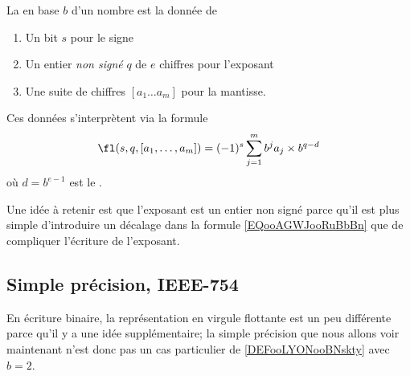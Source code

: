 \begin{definition}     \label{DEFooLYONooBNskty}
    La  en base \( b\) d'un nombre est la donnée de 
    \begin{enumerate}
        \item
            Un bit \( s\) pour le signe
        \item
            Un entier \emph{non signé} \( q\) de \( e\) chiffres pour l'exposant
        \item
            Une suite de chiffres \( [a_1\ldots a_m]\) pour la mantisse.
    \end{enumerate}
    Ces données s'interprètent via la formule
    \begin{equation}        \label{EQooAGWJooRuBbBn}
        \fl( s,q,[a_1,\ldots, a_m]  )=(-1)^s\sum_{j=1}^mb^ja_j\times b^{q-d}
    \end{equation}
    où \( d=b^{e-1}\) est le .
\end{definition}
Une idée à retenir est que l'exposant est un entier non signé parce qu'il est plus simple d'introduire un décalage dans la formule \eqref{EQooAGWJooRuBbBn} que de compliquer l'écriture de l'exposant.

\subsection{Simple précision, IEEE-754}

En écriture binaire, la représentation en virgule flottante est un peu différente parce qu'il y a une idée supplémentaire; la simple précision que nous allons voir maintenant n'est donc pas un cas particulier de \ref{DEFooLYONooBNskty} avec \( b=2\).

